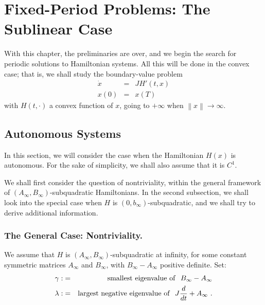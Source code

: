 %
\section{Fixed-Period Problems: The Sublinear Case}
%
With this chapter, the preliminaries are over, and we begin the search
for periodic solutions to Hamiltonian systems. All this will be done in
the convex case; that is, we shall study the boundary-value problem
\begin{eqnarray*}
  \dot{x}&=&JH' (t,x)\\
  x(0) &=& x(T)
\end{eqnarray*}
with $H(t,\cdot)$ a convex function of $x$, going to $+\infty$ when
$\left\|x\right\| \to \infty$.

%
\subsection{Autonomous Systems}
%
In this section, we will consider the case when the Hamiltonian $H(x)$
is autonomous. For the sake of simplicity, we shall also assume that it
is $C^{1}$.

We shall first consider the question of nontriviality, within the
general framework of
$\left(A_{\infty},B_{\infty}\right)$-subquadratic Hamiltonians. In
the second subsection, we shall look into the special case when $H$ is
$\left(0,b_{\infty}\right)$-subquadratic,
and we shall try to derive additional information.
%
\subsubsection{ The General Case: Nontriviality.}
%
We assume that $H$ is
$\left(A_{\infty},B_{\infty}\right)$-sub\-qua\-dra\-tic at infinity,
for some constant symmetric matrices $A_{\infty}$ and $B_{\infty}$,
with $B_{\infty}-A_{\infty}$ positive definite. Set:
\begin{eqnarray}
\gamma :&=&{\rm smallest\ eigenvalue\ of}\ \ B_{\infty} - A_{\infty} \\
  \lambda : &=& {\rm largest\ negative\ eigenvalue\ of}\ \
  J \frac{d}{dt} +A_{\infty}\ .
\end{eqnarray}

